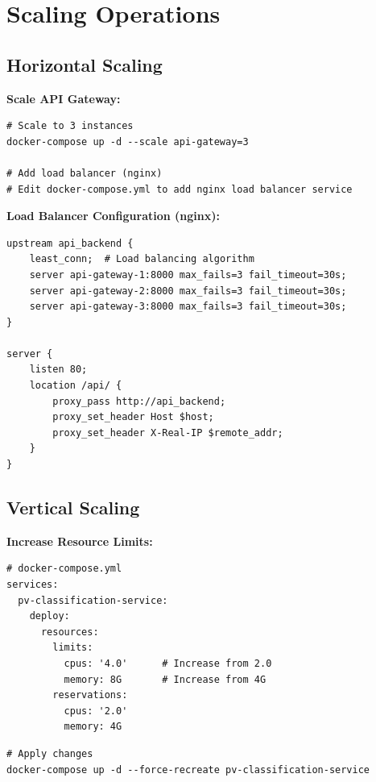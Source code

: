 \section{Scaling Operations}

\subsection{Horizontal Scaling}

\textbf{Scale API Gateway:}
\begin{commandbox}
\begin{lstlisting}[style=bashstyle]
# Scale to 3 instances
docker-compose up -d --scale api-gateway=3

# Add load balancer (nginx)
# Edit docker-compose.yml to add nginx load balancer service
\end{lstlisting}
\end{commandbox}

\textbf{Load Balancer Configuration (nginx):}
\begin{lstlisting}[style=pythonstyle]
upstream api_backend {
    least_conn;  # Load balancing algorithm
    server api-gateway-1:8000 max_fails=3 fail_timeout=30s;
    server api-gateway-2:8000 max_fails=3 fail_timeout=30s;
    server api-gateway-3:8000 max_fails=3 fail_timeout=30s;
}

server {
    listen 80;
    location /api/ {
        proxy_pass http://api_backend;
        proxy_set_header Host $host;
        proxy_set_header X-Real-IP $remote_addr;
    }
}
\end{lstlisting}

\subsection{Vertical Scaling}

\textbf{Increase Resource Limits:}
\begin{lstlisting}[style=pythonstyle]
# docker-compose.yml
services:
  pv-classification-service:
    deploy:
      resources:
        limits:
          cpus: '4.0'      # Increase from 2.0
          memory: 8G       # Increase from 4G
        reservations:
          cpus: '2.0'
          memory: 4G
\end{lstlisting}

\begin{commandbox}
\begin{lstlisting}[style=bashstyle]
# Apply changes
docker-compose up -d --force-recreate pv-classification-service
\end{lstlisting}
\end{commandbox}

